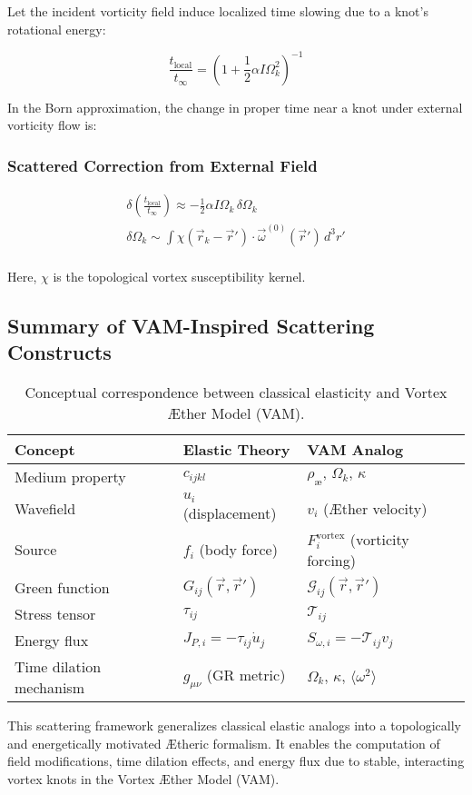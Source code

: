 Let the incident vorticity field induce localized time slowing due to a knot’s rotational energy:

\[
\frac{t_{\text{local}}}{t_{\infty}} = \left(1 + \frac{1}{2} \alpha I \Omega_k^2 \right)^{-1}
\]

In the Born approximation, the change in proper time near a knot under external vorticity flow is:

\subsubsection*{Scattered Correction from External Field}

\begin{gather*}
    \delta \left( \frac{t_{\text{local}}}{t_{\infty}} \right) \approx - \frac{1}{2} \alpha I \Omega_k \, \delta \Omega_k\\
    \delta \Omega_k \sim \int \chi(\vec{r}_k - \vec{r}') \cdot \vec{\omega}^{(0)}(\vec{r}') \, d^3r'\\
\end{gather*}

Here, \(\chi\) is the topological vortex susceptibility kernel.



\subsection{Summary of VAM-Inspired Scattering Constructs}


\begin{table}[htbp]
    \centering
    \begin{tabular}{lll}
        \toprule
        \textbf{Concept} & \textbf{Elastic Theory} & \textbf{VAM Analog} \\
        \midrule
        Medium property & \( c_{ijkl} \) & \( \rho_{\text{\ae}},\, \Omega_k,\, \kappa \) \\
        Wavefield & \( u_i \) (displacement) & \( v_i \) (Æther velocity) \\
        Source & \( f_i \) (body force) & \( F_i^{\text{vortex}} \) (vorticity forcing) \\
        Green function & \( G_{ij}(\vec{r}, \vec{r}') \) & \( \mathcal{G}_{ij}(\vec{r}, \vec{r}') \) \\
        Stress tensor & \( \tau_{ij} \) & \( \mathcal{T}_{ij} \) \\
        Energy flux & \( J_{P,i} = -\tau_{ij} \dot{u}_j \) & \( S_{\omega,i} = -\mathcal{T}_{ij} v_j \) \\
        Time dilation mechanism & \( g_{\mu\nu} \) (GR metric) & \( \Omega_k,\, \kappa,\, \langle \omega^2 \rangle \) \\
        \bottomrule
    \end{tabular}
    \caption{Conceptual correspondence between classical elasticity and Vortex Æther Model (VAM).}
    \label{tab:elastic-vam-analogy}
\end{table}



This scattering framework generalizes classical elastic analogs into a topologically and energetically motivated Ætheric formalism. It enables the computation of field modifications, time dilation effects, and energy flux due to stable, interacting vortex knots in the Vortex Æther Model (VAM).